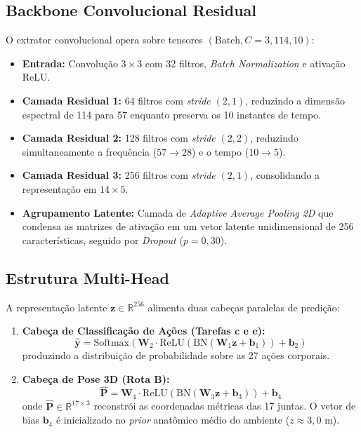 \documentclass[10pt,a4paper,twocolumn]{article}
\begin{document}
\subsection{Backbone Convolucional Residual}
O extrator convolucional opera sobre tensores $(\text{Batch}, C=3, 114, 10)$:
\begin{itemize}
    \item \textbf{Entrada:} Convolução $3\times 3$ com 32 filtros, \textit{Batch Normalization} e ativação ReLU.
    \item \textbf{Camada Residual 1:} 64 filtros com \textit{stride} $(2, 1)$, reduzindo a dimensão espectral de 114 para 57 enquanto preserva os 10 instantes de tempo.
    \item \textbf{Camada Residual 2:} 128 filtros com \textit{stride} $(2, 2)$, reduzindo simultaneamente a frequência ($57 \rightarrow 28$) e o tempo ($10 \rightarrow 5$).
    \item \textbf{Camada Residual 3:} 256 filtros com \textit{stride} $(2, 1)$, consolidando a representação em $14 \times 5$.
    \item \textbf{Agrupamento Latente:} Camada de \textit{Adaptive Average Pooling 2D} que condensa as matrizes de ativação em um vetor latente unidimensional de 256 características, seguido por \textit{Dropout} ($p = 0{,}30$).
\end{itemize}

\subsection{Estrutura Multi-Head}
A representação latente $\mathbf{z} \in \mathbb{R}^{256}$ alimenta duas cabeças paralelas de predição:
\begin{enumerate}
    \item \textbf{Cabeça de Classificação de Ações (Tarefas c e e):}
    \begin{equation}
    \hat{\mathbf{y}} = \text{Softmax}(\mathbf{W}_2 \cdot \text{ReLU}(\text{BN}(\mathbf{W}_1 \mathbf{z} + \mathbf{b}_1)) + \mathbf{b}_2)
    \end{equation}
    produzindo a distribuição de probabilidade sobre as 27 ações corporais.
    \item \textbf{Cabeça de Pose 3D (Rota B):}
    \begin{equation}
    \hat{\mathbf{P}} = \mathbf{W}_4 \cdot \text{ReLU}(\text{BN}(\mathbf{W}_3 \mathbf{z} + \mathbf{b}_3)) + \mathbf{b}_4
    \end{equation}
    onde $\hat{\mathbf{P}} \in \mathbb{R}^{17 \times 3}$ reconstrói as coordenadas métricas das 17 juntas. O vetor de bias $\mathbf{b}_4$ é inicializado no \textit{prior} anatômico médio do ambiente ($z \approx 3{,}0\text{ m}$).
\end{enumerate}
\end{document}
